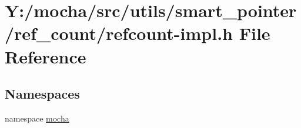 \hypertarget{refcount-impl_8h}{
\section{Y:/mocha/src/utils/smart\_\-pointer/ref\_\-count/refcount-\/impl.h File Reference}
\label{refcount-impl_8h}
}
\subsection*{Namespaces}
\begin{DoxyCompactItemize}
\item 
namespace \hyperlink{namespacemocha}{mocha}
\end{DoxyCompactItemize}
